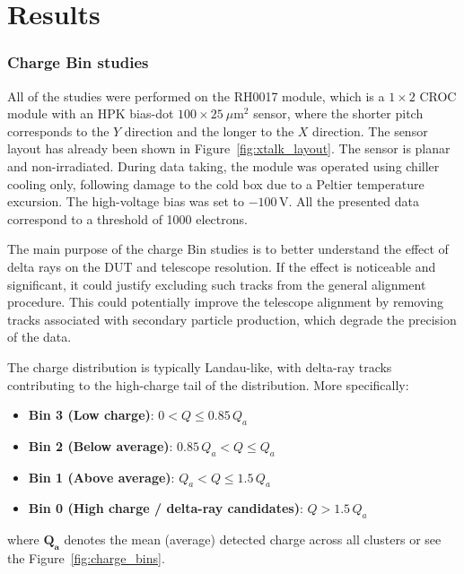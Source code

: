
\chapter{Results}

\subsection{Charge Bin studies}

All of the studies were performed on the RH0017 module, which is a $1 \times 2$ CROC module with an HPK bias-dot $100 \times 25~\mu\text{m}^2$ sensor, where the shorter pitch corresponds to the $Y$ direction and the longer to the $X$ direction. The sensor layout has already been shown in Figure~\ref{fig:xtalk_layout}. The sensor is planar and non-irradiated. During data taking, the module was operated using chiller cooling only, following damage to the cold box due to a Peltier temperature excursion. The high-voltage bias was set to $-100$\,V. All the presented data correspond to a threshold of 1000 electrons.

The main purpose of the charge Bin studies is to better understand the effect of delta rays on the DUT and telescope resolution. If the effect is noticeable and significant, it could justify excluding such tracks from the general alignment procedure. This could potentially improve the telescope alignment by removing tracks associated with secondary particle production, which degrade the precision of the data.

The charge distribution is typically Landau-like, with delta-ray tracks contributing to the high-charge tail of the distribution. More specifically:
\begin{itemize}
    \item \textbf{Bin 3 (Low charge)}: $0 < Q \leq 0.85\,Q_a$
    \item \textbf{Bin 2 (Below average)}: $0.85\,Q_a < Q \leq Q_a$
    \item \textbf{Bin 1 (Above average)}: $Q_a < Q \leq 1.5\,Q_a$
    \item \textbf{Bin 0 (High charge / delta-ray candidates)}: $Q > 1.5\,Q_a$
\end{itemize}
\noindent
where \( \mathbf{Q_a} \) denotes the mean (average) detected charge across all clusters or see the Figure~\ref{fig:charge_bins}.

